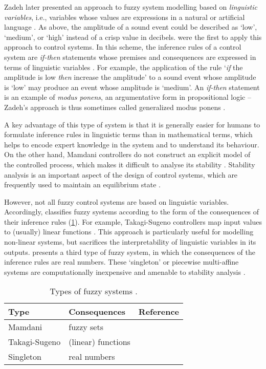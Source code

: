 Zadeh later presented an approach to fuzzy system modelling based on \emph{linguistic
  variables}, i.e., variables whose values are expressions in a natural or artificial
language \parencite*[199]{Zadeh1975}.
As above, the amplitude of a sound event could be described as `low', `medium', or
`high' instead of a crisp value in decibels.
\textcite{Mamdani1975} were the first to apply this approach to control systems.
In this scheme, the inference rules of a control system are \emph{if-then} statements
whose premises and consequences are expressed in terms of linguistic variables
\parencite[57-58]{Nguyen2019}.
For example, the application of the rule `\emph{if} the amplitude is low \emph{then}
increase the amplitude' to a sound event whose amplitude is `low' may produce an event
whose amplitude is `medium'.
An \emph{if-then} statement is an example of \emph{modus ponens}, an argumentative form
in propositional logic -- Zadeh's approach is thus sometimes called generalized modus
ponens \parencite[e.g.][]{Dubois1984}.

A key advantage of this type of system is that it is generally easier for humans to
formulate inference rules in linguistic terms than in mathematical terms, which helps
to encode expert knowledge in the system and to understand its behaviour.
On the other hand, Mamdani controllers do not construct an explicit model of the
controlled process, which makes it difficult to analyse its stability
\parencite[58]{Nguyen2019}.
Stability analysis is an important aspect of the design of control systems, which are
frequently used to maintain an equilibrium state \parencite[3]{Doyle1990}.

However, not all fuzzy control systems are based on linguistic variables.
Accordingly, \textcite{Sugeno1985} classifies fuzzy systems according to the form of
the consequences of their inference rules (\cref{tab:types-of-fuzzy-systems}).
For example, Takagi-Sugeno controllers map input values to (usually) linear functions
\parencites{Takagi1985}[58-59]{Nguyen2019}.
This approach is particularly useful for modelling non-linear systems, but sacrifices
the interpretability of linguistic variables in its outputs.
\textcite{Nguyen2017} presents a third type of fuzzy system, in which the consequences
of the inference rules are real numbers.
These `singleton' or piecewise multi-affine systems are computationally inexpensive and
amenable to stability analysis \parencite[63-64]{Nguyen2019}.

\begin{table}
  \centering
  \begin{tabular}{lll}
    \toprule
    Type          & Consequences       & Reference
    \\
    \midrule
    Mamdani       & fuzzy sets         & \textcite{Mamdani1975}
    \\
    Takagi-Sugeno & (linear) functions & \textcite{Takagi1985}
    \\
    Singleton     & real numbers       & \textcite{Nguyen2017}
    \\
    \bottomrule
  \end{tabular}
  \caption{Types of fuzzy systems \parencite{Nguyen2019}.}
  \label{tab:types-of-fuzzy-systems}
\end{table}

